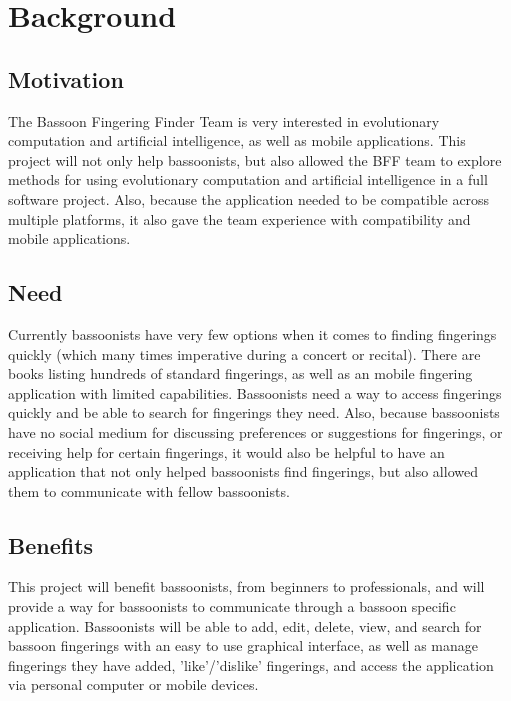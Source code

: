 \documentclass[12pt,english]{article}
\begin{document}
\section{Background}


\subsection{Motivation}

The Bassoon Fingering Finder Team is very interested in evolutionary
computation and artificial intelligence, as well as mobile applications.
This project will not only help bassoonists, but also allowed the
BFF team to explore methods for using evolutionary computation and
artificial intelligence in a full software project. Also, because
the application needed to be compatible across multiple platforms,
it also gave the team experience with compatibility and mobile applications.


\subsection{Need}

Currently bassoonists have very few options when it comes to finding
fingerings quickly (which many times imperative during a concert or
recital). There are books listing hundreds of standard fingerings,
as well as an mobile fingering application with limited capabilities.
Bassoonists need a way to access fingerings quickly and be able to
search for fingerings they need. Also, because bassoonists have no
social medium for discussing preferences or suggestions for fingerings,
or receiving help for certain fingerings, it would also be helpful
to have an application that not only helped bassoonists find fingerings,
but also allowed them to communicate with fellow bassoonists.


\subsection{Benefits}

This project will benefit bassoonists, from beginners to professionals,
and will provide a way for bassoonists to communicate through a bassoon
specific application. Bassoonists will be able to add, edit, delete,
view, and search for bassoon fingerings with an easy to use graphical
interface, as well as manage fingerings they have added, 'like'/'dislike'
fingerings, and access the application via personal computer or mobile
devices.
\end{document}

